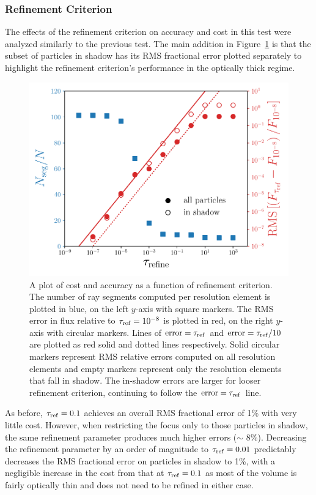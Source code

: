 \documentclass[fleq,usenatbib]{mnras}
\newcommand{\tr}{\tau_{\rm ref}}
\begin{document}
{\subsubsection{Refinement Criterion}
The effects of the refinement criterion on accuracy and cost in this test were 
analyzed similarly to the previous test. The main addition in 
Figure~\ref{fig:isosph} is that the subset of particles in shadow has its RMS 
fractional error plotted separately to highlight the refinement criterion's 
performance in the optically thick regime.
\begin{figure}
\includegraphics[width=1\linewidth]{Figures/isothermal_spheres.pdf}
\caption{A plot of cost and accuracy as a function of refinement criterion. 
The number of ray segments computed per resolution element is plotted in blue, 
on the left $y$-axis with square markers. The RMS error in flux relative to 
$\tr=10^{-8}$ is plotted in red, on the right $y$-axis with circular markers. 
Lines of ${\rm error} = \tr$ and ${\rm error} = \tr/10$ are plotted as red 
solid and dotted lines respectively. Solid circular markers represent RMS 
relative errors computed on all resolution elements and empty markers 
represent only the resolution elements that fall in shadow. The in-shadow 
errors are larger for looser refinement criterion, continuing to follow the 
${\rm error} = \tr$ line.} 
\label{fig:isosph}
\end{figure}
As before, $\tr=0.1$ achieves an overall RMS fractional error of 1\% with very 
little cost. However, when restricting the focus only to those particles in 
shadow, the same refinement parameter produces much higher errors
($\sim$ 8\%). 
Decreasing the refinement 
parameter by an order of magnitude to $\tr=0.01$ predictably decreases the RMS 
fractional error on particles in shadow to 1\%, with a negligible 
increase in the cost from that at $\tr=0.1$ as most of the volume is fairly 
optically thin and does not need to be refined in either case.

}
\end{document}
